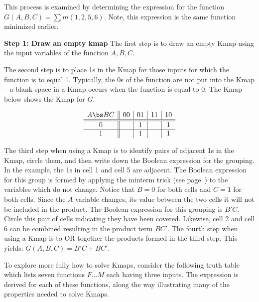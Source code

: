 \begin{process:minimizationKmap}
\label{process:minimizationKmap}
 This process is examined by 
determining the \SOPmin expression for the function 
$G(A,B,C)=\sum m(1,2,5,6)$.  Note, this expression is the
same function minimized earlier.  

\textbf{Step 1: Draw an empty kmap}
The first step is to draw an empty Kmap using the input variables of the function $A,B,C$.


The second step is to place 1s in the Kmap for those inputs
for which the function is to equal 1.  Typically, the 0s of
the function are not put into the Kmap -- a blank space
in a Kmap occurs when the function is equal to 0.  The Kmap
below shows the Kmap for $G$.

$$ \begin{array} {c||c|c|c|c}
	A \bs BC & 00 & 01 & 11 & 10 \\ \hline \hline
	0        &    & 1  &    & 1  \\ \hline
	1        &    & 1  &    & 1  \\ 
\end{array} $$

The third step when using a Kmap is to identify pairs of
adjacent 1s in the Kmap, circle them, and then write down
the Boolean expression for the grouping.
In the example, the 1s in cell 1 and cell 5 are adjacent.  The
Boolean expression for this group is formed by applying
the minterm trick \label{trick!minterm}
(see page~\pageref{page:MinTrick}) to the variables which do 
not change.  Notice that $B=0$ for both cells and $C=1$ for 
both cells.  Since the $A$ variable changes, its value between
the two cells it will not be included in the product.  The 
Boolean expression for this grouping is $B'C$.  Circle 
this pair of cells indicating they have been covered.
Likewise, cell 2 and cell 6 can be combined resulting in the 
product term $BC'$.  The fourth step when using a Kmap 
is to OR together the products formed in the third step.  
This yields: $G(A,B,C) = B'C + BC'$.

To explore more fully how to solve Kmaps, consider the
following truth table which lists seven functions $F \ldots M$ 
each having three inputs.  The \SOPmin expression is derived 
for each of these functions, along the way 
illustrating many of the properties needed to solve Kmaps.


\end{process:minimizationKmap}
